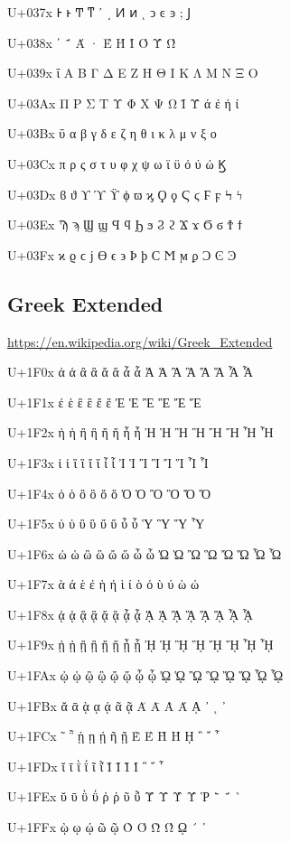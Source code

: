 U+037x 	Ͱ 	ͱ 	Ͳ 	ͳ 	ʹ 	͵ 	Ͷ 	ͷ 			ͺ 	ͻ 	ͼ 	ͽ 	; 	Ϳ

U+038x 					΄ 	΅ 	Ά 	· 	Έ 	Ή 	Ί 		Ό 		Ύ 	Ώ

U+039x 	ΐ 	Α 	Β 	Γ 	Δ 	Ε 	Ζ 	Η 	Θ 	Ι 	Κ 	Λ 	Μ 	Ν 	Ξ 	Ο

U+03Ax 	Π 	Ρ 		Σ 	Τ 	Υ 	Φ 	Χ 	Ψ 	Ω 	Ϊ 	Ϋ 	ά 	έ 	ή 	ί

U+03Bx 	ΰ 	α 	β 	γ 	δ 	ε 	ζ 	η 	θ 	ι 	κ 	λ 	μ 	ν 	ξ 	ο

U+03Cx 	π 	ρ 	ς 	σ 	τ 	υ 	φ 	χ 	ψ 	ω 	ϊ 	ϋ 	ό 	ύ 	ώ 	Ϗ

U+03Dx 	ϐ 	ϑ 	ϒ 	ϓ 	ϔ 	ϕ 	ϖ 	ϗ 	Ϙ 	ϙ 	Ϛ 	ϛ 	Ϝ 	ϝ 	Ϟ 	ϟ

U+03Ex 	Ϡ 	ϡ 	Ϣ 	ϣ 	Ϥ 	ϥ 	Ϧ 	ϧ 	Ϩ 	ϩ 	Ϫ 	ϫ 	Ϭ 	ϭ 	Ϯ 	ϯ

U+03Fx 	ϰ 	ϱ 	ϲ 	ϳ 	ϴ 	ϵ 	϶ 	Ϸ 	ϸ 	Ϲ 	Ϻ 	ϻ 	ϼ 	Ͻ 	Ͼ 	Ͽ


\subsection{Greek Extended}
\url{https://en.wikipedia.org/wiki/Greek_Extended}

U+1F0x 	ἀ 	ἁ 	ἂ 	ἃ 	ἄ 	ἅ 	ἆ 	ἇ 	Ἀ 	Ἁ 	Ἂ 	Ἃ 	Ἄ 	Ἅ 	Ἆ 	Ἇ

U+1F1x 	ἐ 	ἑ 	ἒ 	ἓ 	ἔ 	ἕ 			Ἐ 	Ἑ 	Ἒ 	Ἓ 	Ἔ 	Ἕ 		

U+1F2x 	ἠ 	ἡ 	ἢ 	ἣ 	ἤ 	ἥ 	ἦ 	ἧ 	Ἠ 	Ἡ 	Ἢ 	Ἣ 	Ἤ 	Ἥ 	Ἦ 	Ἧ

U+1F3x 	ἰ 	ἱ 	ἲ 	ἳ 	ἴ 	ἵ 	ἶ 	ἷ 	Ἰ 	Ἱ 	Ἲ 	Ἳ 	Ἴ 	Ἵ 	Ἶ 	Ἷ

U+1F4x 	ὀ 	ὁ 	ὂ 	ὃ 	ὄ 	ὅ 			Ὀ 	Ὁ 	Ὂ 	Ὃ 	Ὄ 	Ὅ 		

U+1F5x 	ὐ 	ὑ 	ὒ 	ὓ 	ὔ 	ὕ 	ὖ 	ὗ 		Ὑ 		Ὓ 		Ὕ 		Ὗ

U+1F6x 	ὠ 	ὡ 	ὢ 	ὣ 	ὤ 	ὥ 	ὦ 	ὧ 	Ὠ 	Ὡ 	Ὢ 	Ὣ 	Ὤ 	Ὥ 	Ὦ 	Ὧ

U+1F7x 	ὰ 	ά 	ὲ 	έ 	ὴ 	ή 	ὶ 	ί 	ὸ 	ό 	ὺ 	ύ 	ὼ 	ώ 		

U+1F8x 	ᾀ 	ᾁ 	ᾂ 	ᾃ 	ᾄ 	ᾅ 	ᾆ 	ᾇ 	ᾈ 	ᾉ 	ᾊ 	ᾋ 	ᾌ 	ᾍ 	ᾎ 	ᾏ

U+1F9x 	ᾐ 	ᾑ 	ᾒ 	ᾓ 	ᾔ 	ᾕ 	ᾖ 	ᾗ 	ᾘ 	ᾙ 	ᾚ 	ᾛ 	ᾜ 	ᾝ 	ᾞ 	ᾟ

U+1FAx 	ᾠ 	ᾡ 	ᾢ 	ᾣ 	ᾤ 	ᾥ 	ᾦ 	ᾧ 	ᾨ 	ᾩ 	ᾪ 	ᾫ 	ᾬ 	ᾭ 	ᾮ 	ᾯ

U+1FBx 	ᾰ 	ᾱ 	ᾲ 	ᾳ 	ᾴ 		ᾶ 	ᾷ 	Ᾰ 	Ᾱ 	Ὰ 	Ά 	ᾼ 	᾽ 	ι 	᾿

U+1FCx 	῀ 	῁ 	ῂ 	ῃ 	ῄ 		ῆ 	ῇ 	Ὲ 	Έ 	Ὴ 	Ή 	ῌ 	῍ 	῎ 	῏

U+1FDx 	ῐ 	ῑ 	ῒ 	ΐ 			ῖ 	ῗ 	Ῐ 	Ῑ 	Ὶ 	Ί 		῝ 	῞ 	῟

U+1FEx 	ῠ 	ῡ 	ῢ 	ΰ 	ῤ 	ῥ 	ῦ 	ῧ 	Ῠ 	Ῡ 	Ὺ 	Ύ 	Ῥ 	῭ 	΅ 	`

U+1FFx 			ῲ 	ῳ 	ῴ 		ῶ 	ῷ 	Ὸ 	Ό 	Ὼ 	Ώ 	ῼ 	´ 	῾ 	
 

